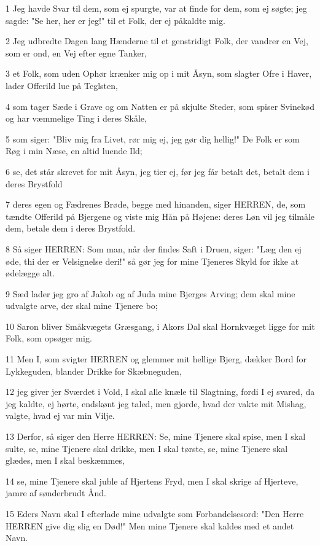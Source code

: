 \par 1 Jeg havde Svar til dem, som ej spurgte, var at finde for dem, som ej søgte; jeg sagde: "Se her, her er jeg!" til et Folk, der ej påkaldte mig.
\par 2 Jeg udbredte Dagen lang Hænderne til et genstridigt Folk, der vandrer en Vej, som er ond, en Vej efter egne Tanker,
\par 3 et Folk, som uden Ophør krænker mig op i mit Åsyn, som slagter Ofre i Haver, lader Offerild lue på Teglsten,
\par 4 som tager Sæde i Grave og om Natten er på skjulte Steder, som spiser Svinekød og har væmmelige Ting i deres Skåle,
\par 5 som siger: "Bliv mig fra Livet, rør mig ej, jeg gør dig hellig!" De Folk er som Røg i min Næse, en altid luende Ild;
\par 6 se, det står skrevet for mit Åsyn, jeg tier ej, før jeg får betalt det, betalt dem i deres Brystfold
\par 7 deres egen og Fædrenes Brøde, begge med hinanden, siger HERREN, de, som tændte Offerild på Bjergene og viste mig Hån på Højene: deres Løn vil jeg tilmåle dem, betale dem i deres Brystfold.
\par 8 Så siger HERREN: Som man, når der findes Saft i Druen, siger: "Læg den ej øde, thi der er Velsignelse deri!" så gør jeg for mine Tjeneres Skyld for ikke at ødelægge alt.
\par 9 Sæd lader jeg gro af Jakob og af Juda mine Bjerges Arving; dem skal mine udvalgte arve, der skal mine Tjenere bo;
\par 10 Saron bliver Småkvægets Græsgang, i Akors Dal skal Hornkvæget ligge for mit Folk, som opsøger mig.
\par 11 Men I, som svigter HERREN og glemmer mit hellige Bjerg, dækker Bord for Lykkeguden, blander Drikke for Skæbneguden,
\par 12 jeg giver jer Sværdet i Vold, I skal alle knæle til Slagtning, fordi I ej svared, da jeg kaldte, ej hørte, endskønt jeg taled, men gjorde, hvad der vakte mit Mishag, valgte, hvad ej var min Vilje.
\par 13 Derfor, så siger den Herre HERREN: Se, mine Tjenere skal spise, men I skal sulte, se, mine Tjenere skal drikke, men I skal tørste, se, mine Tjenere skal glædes, men I skal beskæmmes,
\par 14 se, mine Tjenere skal juble af Hjertens Fryd, men I skal skrige af Hjerteve, jamre af sønderbrudt Ånd.
\par 15 Eders Navn skal I efterlade mine udvalgte som Forbandelsesord: "Den Herre HERREN give dig slig en Død!" Men mine Tjenere skal kaldes med et andet Navn.
